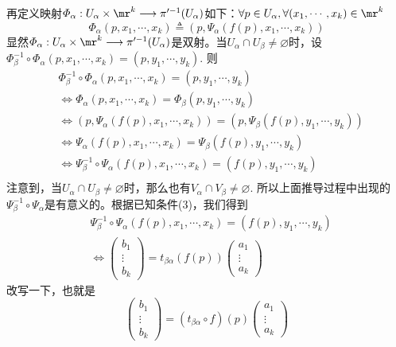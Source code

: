 再定义映射$\varPhi_{\alpha} :U_{\alpha}\times \mr^{k}\longrightarrow \pi^{\prime -1}(U_{\alpha})$如下：$\forall p\in U_{\alpha},\forall (x_{1},\cdots,x_{k})\in \mr^{k}$
\[
\varPhi_{\alpha}(p,x_{1},\cdots,x_{k})\triangleq \left( p,\varPsi_{\alpha}(f(p),x_{1},\cdots,x_{k}) \right)
\]
显然$\varPhi_{\alpha} :U_{\alpha}\times \mr^{k}\longrightarrow \pi^{\prime -1}(U_{\alpha})$是双射。当$U_{\alpha}\cap U_{\beta}\neq\varnothing$时，设$\varPhi^{ -1}_{\beta}\circ\varPhi_{\alpha}(p,x_{1},\cdots,x_{k})=(p,y_{1},\cdots,y_{k})$. 则
\[
\begin{split}
&\varPhi^{ -1}_{\beta}\circ\varPhi_{\alpha}(p,x_{1},\cdots,x_{k})=(p,y_{1},\cdots,y_{k})\\
&\Leftrightarrow \varPhi_{\alpha}(p,x_{1},\cdots,x_{k})=\varPhi_{\beta}(p,y_{1},\cdots,y_{k})\\
&\Leftrightarrow  \left( p,\varPsi_{\alpha}(f(p),x_{1},\cdots,x_{k}) \right)= \left( p,\varPsi_{\beta}(f(p),y_{1},\cdots,y_{k}) \right)\\
&\Leftrightarrow \varPsi_{\alpha}(f(p),x_{1},\cdots,x_{k})=\varPsi_{\beta}(f(p),y_{1},\cdots,y_{k})\\
&\Leftrightarrow \varPsi^{-1}_{\beta}\circ\varPsi_{\alpha}(f(p),x_{1},\cdots,x_{k})=(f(p),y_{1},\cdots,y_{k})\\
\end{split}
\]
注意到，当$U_{\alpha}\cap U_{\beta}\neq\varnothing$时，那么也有$V_{\alpha}\cap V_{\beta}\neq\varnothing$. 所以上面推导过程中出现的$\varPsi^{-1}_{\beta}\circ\varPsi_{\alpha}$是有意义的。根据已知条件(3)，我们得到
\[
\begin{split}
	&\varPsi^{-1}_{\beta}\circ\varPsi_{\alpha}(f(p),x_{1},\cdots,x_{k})=(f(p),y_{1},\cdots,y_{k})\\
	&\Leftrightarrow \left( \begin{array}{ccc}{b_{1}} \\ {\vdots}  \\ {b_{k}} \end{array}\right)=t_{\beta\alpha}(f(p)) \left( \begin{array}{ccc}{a_{1}} \\ {\vdots}  \\ {a_{k}} \end{array}\right)
\end{split}
\]
改写一下，也就是
\[
\left( \begin{array}{ccc}{b_{1}} \\ {\vdots}  \\ {b_{k}} \end{array}\right)=(t_{\beta\alpha}\circ f)(p) \left( \begin{array}{ccc}{a_{1}} \\ {\vdots}  \\ {a_{k}} \end{array}\right)
\]

